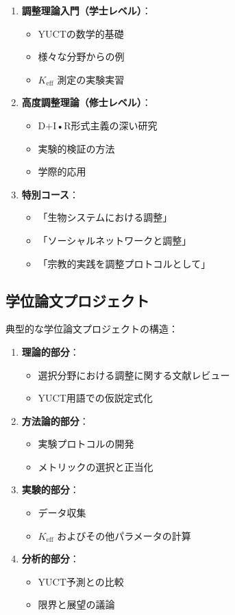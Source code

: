 \documentclass[12pt,a4paper]{article}
\begin{document}
	\begin{enumerate}
		\item \textbf{調整理論入門（学士レベル）}：
		\begin{itemize}
			\item YUCTの数学的基礎
			\item 様々な分野からの例
			\item \(K_{\mathrm{eff}}\) 測定の実験実習
		\end{itemize}
		
		\item \textbf{高度調整理論（修士レベル）}：
		\begin{itemize}
			\item D+I•R形式主義の深い研究
			\item 実験的検証の方法
			\item 学際的応用
		\end{itemize}
		
		\item \textbf{特別コース}：
		\begin{itemize}
			\item 「生物システムにおける調整」
			\item 「ソーシャルネットワークと調整」
			\item 「宗教的実践を調整プロトコルとして」
		\end{itemize}
	\end{enumerate}
	
	\subsection{学位論文プロジェクト}
	
	典型的な学位論文プロジェクトの構造：
	\begin{enumerate}
		\item \textbf{理論的部分}：
		\begin{itemize}
			\item 選択分野における調整に関する文献レビュー
			\item YUCT用語での仮説定式化
		\end{itemize}
		
		\item \textbf{方法論的部分}：
		\begin{itemize}
			\item 実験プロトコルの開発
			\item メトリックの選択と正当化
		\end{itemize}
		
		\item \textbf{実験的部分}：
		\begin{itemize}
			\item データ収集
			\item \(K_{\mathrm{eff}}\) およびその他パラメータの計算
		\end{itemize}
		
		\item \textbf{分析的部分}：
		\begin{itemize}
			\item YUCT予測との比較
			\item 限界と展望の議論
		\end{itemize}
	\end{enumerate}
	
\end{document}
